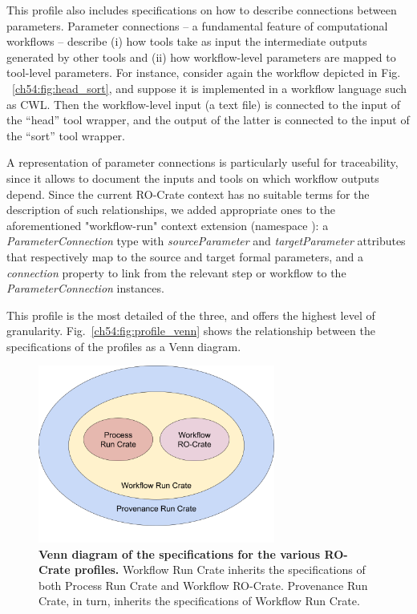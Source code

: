This profile also includes specifications on how to describe connections between parameters.
Parameter connections -- a fundamental feature of computational workflows -- describe (i) how tools take as input the intermediate outputs generated by other tools and (ii) how workflow-level parameters are mapped to tool-level parameters.
For instance, consider again the workflow depicted in Fig. ~\vref{ch54:fig:head_sort},
and suppose it is implemented in a workflow language such as CWL. Then the workflow-level input (a text file) is connected to the input of the “head” tool wrapper, and the output of the latter is connected to the input of the “sort” tool wrapper.


A representation of parameter connections is particularly useful for traceability, since it allows to document the inputs and tools on which workflow outputs depend.
Since the current RO-Crate context has no suitable terms for the description of such relationships, 
we added appropriate ones to the aforementioned  "workflow-run" context extension (namespace ):
a \emph{ParameterConnection} type with
\emph{sourceParameter} and \emph{targetParameter} attributes that respectively map to the source and target formal parameters, and a
\emph{connection} property to link from the relevant step or workflow to the \emph{ParameterConnection} instances.

This profile is the most detailed of the three, and offers the highest level of granularity. Fig.~\vref{ch54:fig:profile_venn} shows the relationship between the specifications of the profiles as a Venn diagram.

\begin{figure}[!h]
  \includegraphics[width=21em]{figures/ch54/venn.png}
  \caption{{\bf Venn diagram of the specifications for the various RO-Crate profiles.}
  Workflow Run Crate inherits the specifications of both Process Run Crate and Workflow RO-Crate. Provenance Run Crate, in turn, inherits the specifications of Workflow Run Crate.}
  \label{ch54:fig:profile_venn}
  \end{figure}


